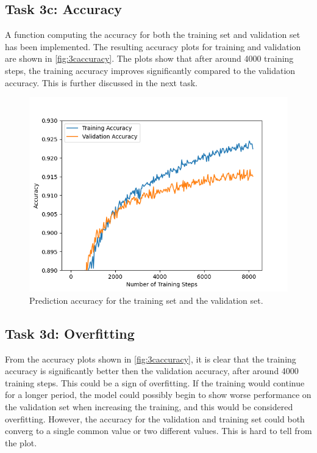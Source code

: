 \documentclass{article}
\begin{document}
\subsection{Task 3c: Accuracy}
A function computing the accuracy for both the training set and validation set has been implemented. The resulting accuracy plots for training and validation are shown in \autoref{fig:3caccuracy}. The plots show that after around 4000 training steps, the training accuracy improves significantly compared to the validation accuracy. This is further discussed in the next task.
\begin{figure}[H]
    \centering
    \includegraphics{Assignment_1/Assignments/plots/task3/task3b_softmax_train_accuracy.png}
    \caption{Prediction accuracy for the training set  and the validation set.}
    \label{fig:3caccuracy}
\end{figure}

\subsection{Task 3d: Overfitting}

From the accuracy plots shown in \autoref{fig:3caccuracy}, it is clear that the training accuracy is significantly better then the validation accuracy, after around 4000 training steps. This could be a sign of overfitting. If the training would continue for a longer period, the model could possibly begin to show worse performance on the validation set when increasing the training, and this would be considered overfitting. However, the accuracy for the validation and training set could both converg to a single common value or two different values. This is hard to tell from the plot.
\end{document}
